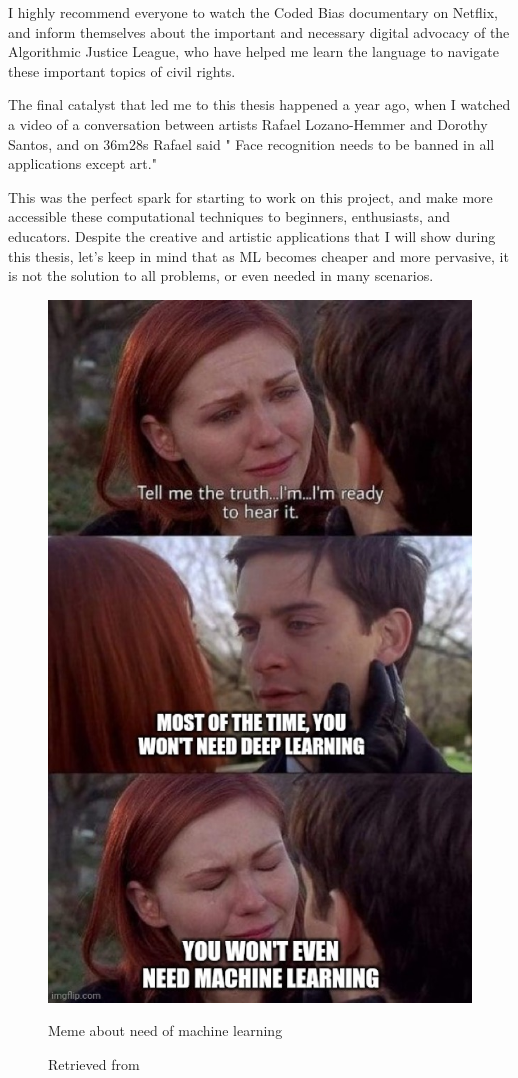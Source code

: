 I highly recommend everyone to watch the Coded Bias documentary on Netflix, and inform themselves about the important and necessary digital advocacy of the Algorithmic Justice League, who have helped me learn the language to navigate these important topics of civil rights.

The final catalyst that led me to this thesis happened a year ago, when I watched a video \cite{website-talk-technology-and-public-art-rafael-lozano-hemmer} of a conversation between artists Rafael Lozano-Hemmer and Dorothy Santos, and on 36m28s Rafael said " Face recognition needs to be banned in all applications except art."

This was the perfect spark for starting to work on this project, and make more accessible these computational techniques to beginners, enthusiasts, and educators. Despite the creative and artistic applications that I will show during this thesis, let's keep in mind that as \acrshort{ML} becomes cheaper and more pervasive, it is not the solution to all problems, or even needed in many scenarios.

\begin{figure}[ht]
  \centering
  \includegraphics[width=0.75\linewidth,height=0.40\textheight,keepaspectratio]{images/meme-spider-man.jpg}
  \caption{Meme about need of machine learning}
  \caption*{Retrieved from \cite{website-twitter-dynamicwebpaige-meme}}
  \label{fig:meme-spider-man}
\end{figure}

